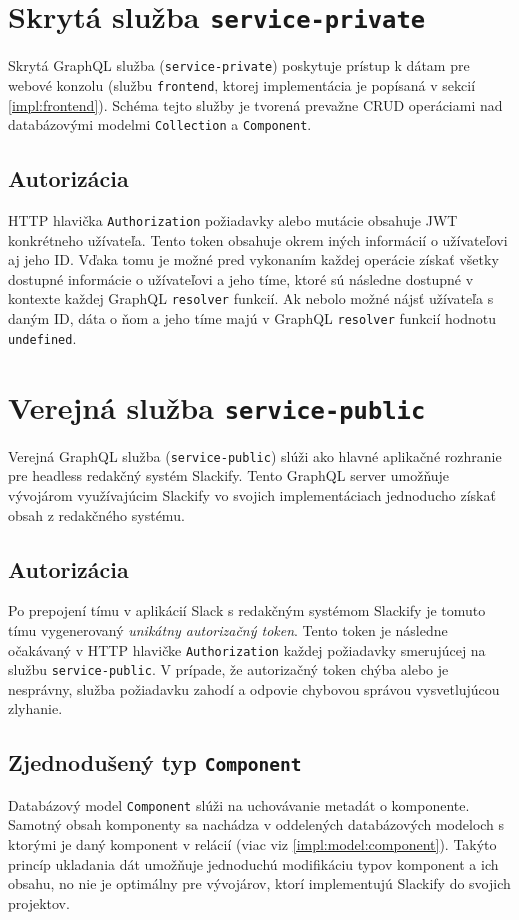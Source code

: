 \section{Skrytá služba \texttt{service-private}}
\label{impl:service-private}
Skrytá GraphQL služba (\texttt{service-private}) poskytuje prístup k dátam pre webové konzolu (službu \texttt{frontend}, ktorej implementácia je popísaná v sekcií \ref{impl:frontend}). Schéma tejto služby je tvorená prevažne CRUD operáciami nad databázovými modelmi \texttt{Collection} a \texttt{Component}.

\subsection{Autorizácia}
HTTP hlavička \texttt{Authorization} požiadavky alebo mutácie obsahuje JWT konkrétneho užívateľa. Tento token obsahuje okrem iných informácií o užívateľovi aj jeho ID. Vďaka tomu je možné pred vykonaním každej operácie získať všetky dostupné informácie o užívateľovi a jeho tíme, ktoré sú následne dostupné v kontexte každej GraphQL \texttt{resolver} funkcií. Ak nebolo možné nájsť užívateľa s daným ID, dáta o ňom a jeho tíme majú v GraphQL \texttt{resolver} funkcií hodnotu \texttt{undefined}.

\section{Verejná služba \texttt{service-public}}
\label{impl:service-public}
Verejná GraphQL služba (\texttt{service-public}) slúži ako hlavné aplikačné rozhranie pre headless redakčný systém Slackify. Tento GraphQL server umožňuje vývojárom využívajúcim Slackify vo svojich implementáciach jednoducho získať obsah z redakčného systému.

\subsection{Autorizácia}
Po prepojení tímu v aplikácií Slack s redakčným systémom Slackify je tomuto tímu vygenerovaný \emph{unikátny autorizačný token}. Tento token je následne očakávaný v HTTP hlavičke \texttt{Authorization} každej požiadavky smerujúcej na službu \texttt{service-public}. V prípade, že autorizačný token chýba alebo je nesprávny, služba požiadavku zahodí a odpovie chybovou správou vysvetlujúcou zlyhanie. 

\subsection{Zjednodušený typ \texttt{Component}}
Databázový model \texttt{Component} slúži na uchovávanie metadát o komponente. Samotný obsah komponenty sa nachádza v oddelených databázových modeloch s ktorými je daný komponent v relácií (viac viz \ref{impl:model:component}). Takýto princíp ukladania dát umožňuje jednoduchú modifikáciu typov komponent a ich obsahu, no nie je optimálny pre vývojárov, ktorí implementujú Slackify do svojich projektov. \\

